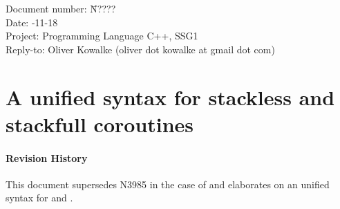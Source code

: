 \documentclass[a4paper,10pt,DIV15]{scrartcl}
\begin{document}
\small
\begin{tabbing}
    Document number: \= N????\\
    Date:            -11-18 \\
    Project:         \> Programming Language C++, SSG1\\
    Reply-to:        \> Oliver Kowalke (oliver dot kowalke at gmail dot com)\\
\end{tabbing}

\section*{A unified syntax for stackless and stackfull coroutines}


\tableofcontents


\paragraph*{Revision History}
This document supersedes N3985 in the case of \ascoros and elaborates on an
unified syntax for \sless and \sfcoros.











\end{document}
